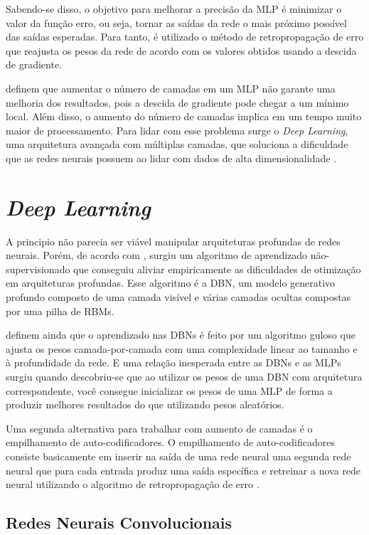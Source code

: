 Sabendo-se disso, o objetivo para melhorar a precisão da \ac{MLP} é minimizar o valor da função erro, ou seja, tornar as saídas da rede o mais próximo possível das saídas esperadas. Para tanto, é utilizado o método de retropropagação de erro que reajusta os pesos da rede de acordo com os valores obtidos usando a descida de gradiente.

 definem que aumentar o número de camadas em um \ac{MLP} não garante uma melhoria dos resultados, pois a descida de gradiente pode chegar a um mínimo local. Além disso, o aumento do número de camadas implica em um tempo muito maior de processamento. Para lidar com esse problema surge o \emph{Deep Learning}, uma arquitetura avançada com múltiplas camadas, que soluciona a dificuldade que as redes neurais possuem ao lidar com dados de alta dimensionalidade \cite{arnold-2011}.

\section{\textit{Deep Learning}}
\label{secao:2:3}

A principio não parecia ser viável manipular arquiteturas profundas de redes neurais. Porém, de acordo com , surgiu um algoritmo de aprendizado não-supervisionado que conseguiu aliviar empiricamente as dificuldades de otimização em arquiteturas profundas. Esse algoritmo é a \ac{DBN}, um modelo generativo profundo composto de uma camada visível e várias camadas ocultas compostas por uma pilha de \ac{RBM}s.

 definem ainda que o aprendizado nas \ac{DBN}s é feito por um algoritmo guloso que ajusta os pesos camada-por-camada com uma complexidade linear ao tamanho e à profundidade da rede. E uma relação inesperada entre as \ac{DBN}s e as \ac{MLP}s surgiu quando descobriu-se que ao utilizar os pesos de uma \ac{DBN} com arquitetura correspondente, você consegue inicializar os pesos de uma \ac{MLP} de forma a produzir melhores resultados do que utilizando pesos aleatórios.

Uma segunda alternativa para trabalhar com aumento de camadas é o empilhamento de auto-codificadores. O empilhamento de auto-codificadores consiste basicamente em inserir na saída de uma rede neural uma segunda rede neural que para cada entrada produz uma saída específica e retreinar a nova rede neural utilizando o algoritmo de retropropagação de erro \cite{deng-2014}.

\subsection{Redes Neurais Convolucionais}
\label{subsecao:2:3:1}


